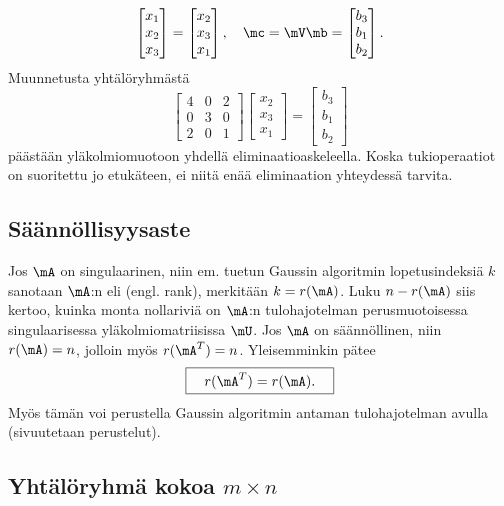 \begin{Exa}
\[               \begin{bmatrix} x_1 \\ x_2 \\ x_3 \end{bmatrix}
             = \begin{bmatrix} x_2 \\ x_3 \\ x_1 \end{bmatrix}, \quad
\mc = \mV\mb = \begin{bmatrix} b_3 \\ b_1 \\ b_2 \end{bmatrix}.
\]
Muunnetusta yhtälöryhmästä
\[
\begin{bmatrix} 4&0&2\\0&3&0\\2&0&1 \end{bmatrix} 
\begin{bmatrix} x_2 \\ x_3 \\ x_1 \end{bmatrix} =
\begin{bmatrix} b_3 \\ b_1 \\ b_2 \end{bmatrix}
\]
päästään yläkolmiomuotoon yhdellä eliminaatioaskeleella. Koska tukioperaatiot on suoritettu jo
etukäteen, ei niitä enää eliminaation yhteydessä tarvita. \loppu
\end{Exa}

\subsection{Säännöllisyysaste}

Jos $\mA$ on singulaarinen, niin em. tuetun Gaussin algoritmin lopetusindeksiä $k$ sanotaan 
$\mA$:n  eli  (engl. rank), merkitään $k=r(\mA)$. 
Luku $n-r(\mA)$ siis kertoo, kuinka monta nollariviä on $\mA$:n tulohajotelman perusmuotoisessa
singulaarisessa yläkolmiomatriisissa $\mU$. Jos $\mA$ on säännöllinen, niin $r(\mA)=n$, jolloin
myös $r(\mA^T)=n$. Yleisemminkin pätee
\[
\boxed{\quad r(\mA^T)=r(\mA). \quad}
\]
Myös tämän voi perustella Gaussin algoritmin antaman tulohajotelman avulla (sivuutetaan
perustelut).

\subsection{Yhtälöryhmä kokoa $m \times n$}


